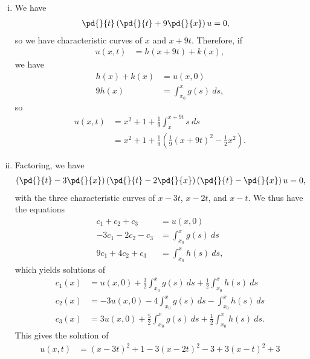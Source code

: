 \documentclass[10pt]{mypackage}
\begin{document}
\begin{solution}
\begin{enumerate}[(i)]
    \item We have
      \begin{align*}
        \pd{}{t}\left( \pd{}{t} + 9\pd{}{x} \right)u &= 0,
      \end{align*}
      so we have characteristic curves of $x$ and $x + 9t$. Therefore, if
      \begin{align*}
        u\left( x,t \right) &= h\left( x + 9t \right) + k\left( x \right),
      \end{align*}
      we have
      \begin{align*}
        h\left( x \right) + k\left( x \right) &= u\left( x,0 \right)\\
        9h(x) &= \int_{x_0}^{x} g(s)\:ds,
      \end{align*}
      so
      \begin{align*}
        u\left( x,t \right) &= x^2 + 1 + \frac{1}{9} \int_{x}^{x + 9t} s\:ds\\
                            &= x^2 + 1 + \frac{1}{9}\left( \frac{1}{9}\left( x+9t \right)^2 - \frac{1}{2}x^2 \right).
      \end{align*}
    \item Factoring, we have
      \begin{align*}
        \left( \pd{}{t}-3\pd{}{x} \right)\left( \pd{}{t}-2\pd{}{x} \right)\left( \pd{}{t}-\pd{}{x} \right)u &= 0,
      \end{align*}
      with the three characteristic curves of $x-3t$, $x-2t$, and $x-t$. We thus have the equations
      \begin{align*}
        c_1 + c_2 + c_3 &= u\left( x,0 \right)\\
        -3c_1-2c_2-c_3 &= \int_{x_0}^{x} g(s)\:ds\\
        9c_1 + 4c_2 + c_3 &= \int_{x_0}^{x} h(s)\:ds,
      \end{align*}
      which yields solutions of
      \begin{align*}
        c_1(x) &= u\left( x,0 \right) + \frac{3}{2} \int_{x_0}^{x} g(s)\:ds + \frac{1}{2} \int_{x_0}^{x} h(s)\:ds\\
        c_2(x) &= -3u\left( x,0 \right) - 4 \int_{x_0}^{x} g(s)\:ds - \int_{x_0}^{x} h(s)\:ds\\
        c_3(x) &= 3u\left( x,0 \right) + \frac{5}{2} \int_{x_0}^{x} g(s)\:ds + \frac{1}{2} \int_{x_0}^{x} h(s)\:ds.
      \end{align*}
      This gives the solution of
      \begin{align*}
        u\left( x,t \right) &= \left( x-3t \right)^2 + 1 - 3\left( x-2t \right)^2-3 + 3\left( x-t \right)^2 + 3\\

\end{align*}
\end{enumerate}
\end{solution}
\end{document}
